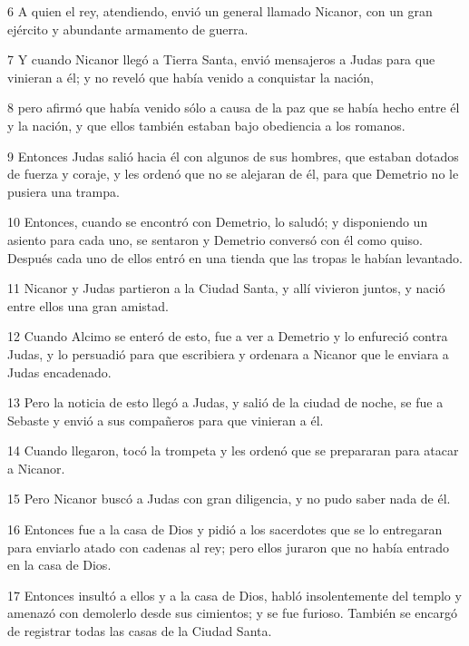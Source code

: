 \par 6 A quien el rey, atendiendo, envió un general llamado Nicanor, con un gran ejército y abundante armamento de guerra.

\par 7 Y cuando Nicanor llegó a Tierra Santa, envió mensajeros a Judas para que vinieran a él; y no reveló que había venido a conquistar la nación,

\par 8 pero afirmó que había venido sólo a causa de la paz que se había hecho entre él y la nación, y que ellos también estaban bajo obediencia a los romanos.

\par 9 Entonces Judas salió hacia él con algunos de sus hombres, que estaban dotados de fuerza y ​​coraje, y les ordenó que no se alejaran de él, para que Demetrio no le pusiera una trampa.

\par 10 Entonces, cuando se encontró con Demetrio, lo saludó; y disponiendo un asiento para cada uno, se sentaron y Demetrio conversó con él como quiso. Después cada uno de ellos entró en una tienda que las tropas le habían levantado.

\par 11 Nicanor y Judas partieron a la Ciudad Santa, y allí vivieron juntos, y nació entre ellos una gran amistad.

\par 12 Cuando Alcimo se enteró de esto, fue a ver a Demetrio y lo enfureció contra Judas, y lo persuadió para que escribiera y ordenara a Nicanor que le enviara a Judas encadenado.

\par 13 Pero la noticia de esto llegó a Judas, y salió de la ciudad de noche, se fue a Sebaste y envió a sus compañeros para que vinieran a él.

\par 14 Cuando llegaron, tocó la trompeta y les ordenó que se prepararan para atacar a Nicanor.

\par 15 Pero Nicanor buscó a Judas con gran diligencia, y no pudo saber nada de él.

\par 16 Entonces fue a la casa de Dios y pidió a los sacerdotes que se lo entregaran para enviarlo atado con cadenas al rey; pero ellos juraron que no había entrado en la casa de Dios.

\par 17 Entonces insultó a ellos y a la casa de Dios, habló insolentemente del templo y amenazó con demolerlo desde sus cimientos; y se fue furioso. También se encargó de registrar todas las casas de la Ciudad Santa.

